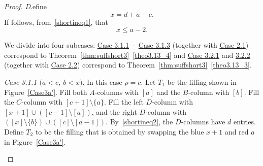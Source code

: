 \documentclass[10pt]{article}
\theoremstyle{definition}
\let\hypertargeta\hypertarget %
\let\hyperlinka\hyperlink %
\newenvironment{Case}[1]{\par\vskip2pt\noindent%
\emph{#1}.}{\vskip2pt}
\begin{document}
\begin{proof}
\begin{Case}
Define 
\begin{equation}
\label{shortineq3}
x = d+a-c.
\end{equation} 
If follows, from~\eqref{shortineq1}, that
\begin{equation}
\label{shortineq4}
x\leq a-2.
\end{equation} 

We divide into four subcases: \hyperlinka{theo3.13_case3.1.1}{Case 3.1.1}~-~\hyperlinka{theo3.13_case3.1.3}{Case 3.1.3} (together with \hyperlinka{theo3.13_case2.1}{Case 2.1}) correspond to Theorem~\ref{thm:suffshort3}~\ref{theo3.13_4} and \hyperlinka{theo3.13_case3.2.1}{Case 3.2.1} and \hyperlinka{theo3.13_case3.2.2}{3.2.2} (together with \hyperlinka{theo3.13_case2.2}{Case 2.2}) correspond to Theorem~\ref{thm:suffshort3}~\ref{theo3.13_3}.


\end{Case}

\begin{Case}
{\hypertargeta{theo3.13_case3.1.1}{Case 3.1.1} $(a< c$, $b< x)$} 
In this case $\rho = c$. Let $T_1$ be the filling shown in Figure~\ref{Case3a'}. Fill both $A$-columns with $[a]$ and the $B$-column with $[b]$. Fill the $C$-column with $[c+1]\setminus \{a\}$. Fill the left $D$-column with $[x+1]\cup ([c-1]\setminus [a])$, and the right $D$-column with $([x]\setminus \{b\})\cup ([c]\setminus [a-1])$. By~\eqref{shortineq2}, the $D$-columns have $d$ entries. Define $T_2$ to be the filling that is obtained by swapping the blue $x+1$ and red $a$ in Figure~\ref{Case3a'}.

\begin{figure}[b]\centering
\end{figure}
\end{Case}
\end{proof}
\end{document}
